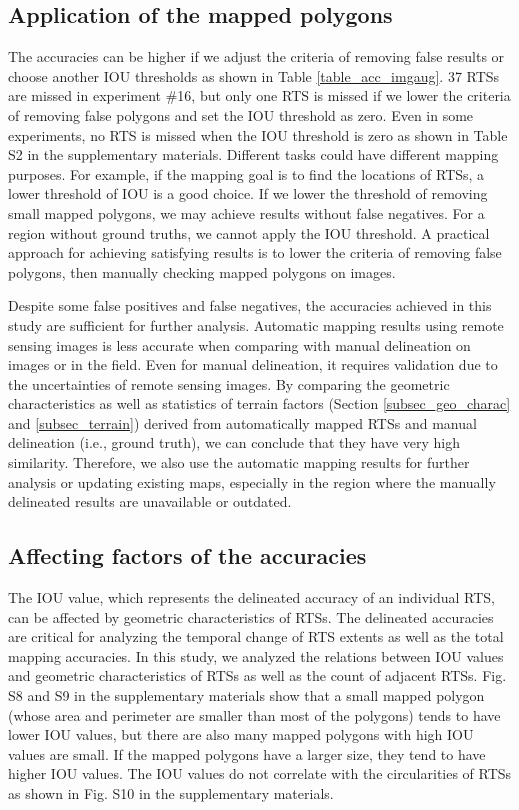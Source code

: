 \documentclass[preprint,12pt,authoryear]{elsarticle}
\begin{document}
\subsection{Application of the mapped polygons}
\label{subsec_potential_largeArea}

The accuracies can be higher if we adjust the criteria of removing false results or choose another IOU thresholds as shown in Table \ref{table_acc_imgaug}. 37 RTSs are missed in experiment \#16, but only one RTS is missed if we lower the criteria of removing false polygons and set the IOU threshold as zero. Even in some experiments, no RTS is missed when the IOU threshold is zero as shown in Table S2 in the supplementary materials. Different tasks could have different mapping purposes. For example, if the mapping goal is to find the locations of RTSs, a lower threshold of IOU is a good choice. If we lower the threshold of removing small mapped polygons, we may achieve results without false negatives. For a region without ground truths, we cannot apply the IOU threshold. A practical approach for achieving satisfying results is to lower the criteria of removing false polygons, then manually checking mapped polygons on images. 

Despite some false positives and false negatives, the accuracies achieved in this study are sufficient for further analysis. Automatic mapping results using remote sensing images is less accurate when comparing with manual delineation on images or in the field. Even for manual delineation, it requires validation due to the uncertainties of remote sensing images. By comparing the geometric characteristics as well as statistics of terrain factors (Section \ref{subsec_geo_charac} and \ref{subsec_terrain}) derived from automatically mapped RTSs and manual delineation (i.e., ground truth), we can conclude that they have very high similarity. Therefore, we also use the automatic mapping results for further analysis or updating existing maps, especially in the region where the manually delineated results are unavailable or outdated. 


\subsection{Affecting factors of the accuracies}
\label{subsec_acc_factors}

The IOU value, which represents the delineated accuracy of an individual RTS, can be affected by geometric characteristics of RTSs. The delineated accuracies are critical for analyzing the temporal change of RTS extents as well as the total mapping accuracies. In this study, we analyzed the relations between IOU values and geometric characteristics of RTSs as well as the count of adjacent RTSs. Fig. S8 and S9 in the supplementary materials show that a small mapped polygon (whose area and perimeter are smaller than most of the polygons) tends to have lower IOU values, but there are also many mapped polygons with high IOU values are small. If the mapped polygons have a larger size, they tend to have higher IOU values. The IOU values do not correlate with the circularities of RTSs as shown in Fig. S10 in the supplementary materials. 
\end{document}
